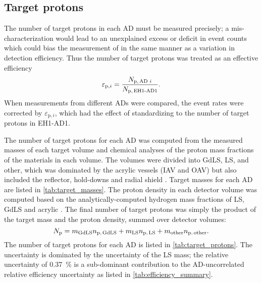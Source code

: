 \subsection{Target protons}
\label{subsec:target_mass}

The number of target protons in each AD must be measured precisely;
a mis-characterization would lead to an unexplained excess or deficit
in event counts which could bias the measurement of \thetaot{}
in the same manner as a variation in detection efficiency.
Thus the number of target protons was treated as an effective efficiency
\begin{equation}\label{eq:target_protons_eff}
    \varepsilon_{\text{p},i} = \frac{N_{\text{p,\,AD }i}}{N_\text{p,\,EH1-AD1}}.
\end{equation}
When measurements from different ADs were compared,
the event rates were corrected by $\varepsilon_{\text{p},i}$,
which had the effect of standardizing to the number of target protons in EH1-AD1.

The number of target protons for each AD was computed from the measured masses
of each target volume
and chemical analyses of the proton mass fractions
of the materials in each volume.
The volumes were divided into GdLS, LS, and other,
which was dominated by the acrylic vessels (IAV and OAV)
but also included the reflector, hold-downs and radial shield \cite{acrylic_mass}.
Target masses for each AD are listed in \cref{tab:target_masses}.
The proton density in each detector volume
was computed based on the analytically-computed
hydrogen mass fractions of LS, GdLS and acrylic \cite{target_protons_technote}.
The final number of target protons was
simply the product of the target mass and the proton density,
summed over detector volumes:
\begin{equation}\label{eq:target_protons}
    N_\text{p} = m_\text{GdLS} n_\text{p,\,GdLS}
    + m_\text{LS} n_\text{p,\,LS}
    + m_\text{other} n_\text{p,\,other}.
\end{equation}
The number of target protons for each AD
is listed in \cref{tab:target_protons}.
The uncertainty is dominated by the uncertainty of the LS mass;
the relative uncertainty of \SI{0.37}{\percent}
is a sub-dominant contribution to the AD-uncorrelated
relative efficiency uncertainty
as listed in \cref{tab:efficiency_summary}.


